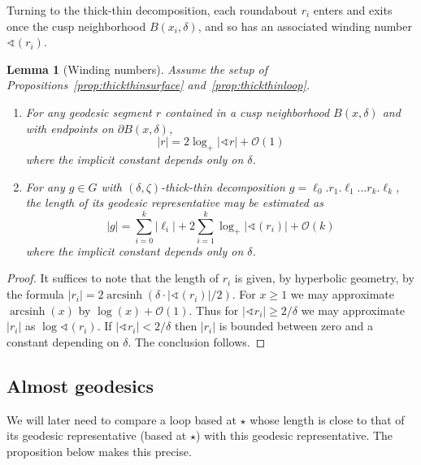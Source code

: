 \documentclass{amsart}
\DeclareMathOperator{\arcsinh}{arcsinh}
\newtheorem{lem}[thm]{Lemma}
\theoremstyle{definition}
\theoremstyle{remark}
\begin{document}
Turning to the thick-thin decomposition, each roundabout $r_i$  enters and exits once the cusp neighborhood $B(x_i,\delta)$, and so has an associated winding number $\sphericalangle(r_i)$.  
\begin{lem}[Winding numbers]\label{lem:lengthest} 
  Assume the setup of Propositions~\ref{prop:thickthinsurface} and~\ref{prop:thickthinloop}.
\begin{enumerate}
\item For any geodesic segment $r$ contained in a cusp neighborhood $B(x,\delta)$ and with endpoints on $\partial B(x,\delta)$, 
\[ |r|=2\log_+|\sphericalangle r| + \mathcal O(1)\]
where the implicit constant depends only on $\delta$.
\item 
 For any $g\in G$ with $(\delta,\zeta)$-thick-thin decomposition $g=\ell_0.r_1.\ell_1\ldots r_k.\ell_k$, the length of its geodesic representative may be estimated as 
  \[|g|=\sum_{i=0}^k|\ell_i|+2\sum_{i=1}^k\log_+|\sphericalangle(r_i)|+\mathcal O(k)\]
  where the implicit constant depends only on $\delta$.
  \end{enumerate}
\end{lem}
\begin{proof}
  It suffices to note that the length of $r_i$ is given, by hyperbolic geometry, by the formula $|r_i|=2\arcsinh(\delta \cdot |\sphericalangle(r_i)|/2)$. For $x \geq 1$ we may approximate $\arcsinh(x)$ by $\log(x)+\mathcal O(1)$.  Thus for $|\sphericalangle r_i|\geq 2/\delta$ we may approximate $|r_i|$ as $\log\sphericalangle(r_i)$. If $|\sphericalangle r_i| < 2/\delta$ then $|r_i|$ is bounded between zero and a constant depending on $\delta$. The conclusion follows.
\end{proof}

\subsection{Almost geodesics}
We will later need to compare a loop based at $\star$ whose length is close to that of its geodesic representative (based at $\star$) with this geodesic representative.  The proposition below makes this precise. 
\end{document}
